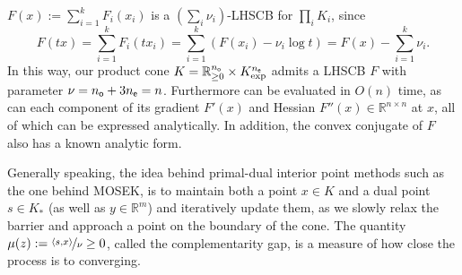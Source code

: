 \begin{lproof}
    $F(x) := \sum_{i=1}^k F_i(x_i)$ is a $(\sum_i \nu_i)$-LHSCB for $\prod_i K_i$,
    since
    \[
        F(tx) = \sum_{i=1}^k F_i(t x_i)
            = \sum_{i=1}^k ( F(x_i) - \nu_i \log t)
            = F(x) - \sum_{i=1}^k \nu_i.
    \]
    In this way, our product cone $K = \mathbb R_{\ge 0}^{n_{\sf o}} \times K^{n_{\sf e}}_{\exp}$ admits a LHSCB $F$ with parameter $\nu = n_{\sf o} + 3 n_{\sf e} = n$. 
    Furthermore can be evaluated in $O(n)$ time, as can each component of
    its gradient $F'(x)$ and Hessian $F''(x) \in \mathbb R^{n \times n}$ at $x$, all of which can be expressed analytically.
    In addition, the convex conjugate of $F$
    also has a known analytic form.
    
    
    Generally speaking, 
    the idea behind primal-dual interior point methods \parencite{nesterov1994book} such as the one behind MOSEK, is 
    to maintain both a point $x \in K$ and a dual point $s \in K_*$ (as well as $y \in \mathbb R^m$)
    and iteratively update them, as we slowly relax the barrier and approach a point on the boundary of the cone. 
    The quantity $\mu(z) := \nicefrac{\langle s, x \rangle}{\nu} \ge 0$, called the complementarity gap, is a measure of how close the process is to converging. 
    

\end{lproof}
